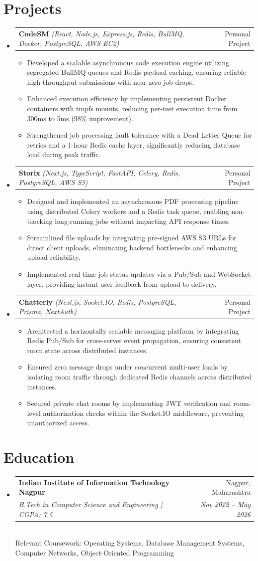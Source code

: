 \documentclass[letterpaper,10pt]{article}
\makeatletter
\newenvironment{resumeList}{
  \begin{itemize}[leftmargin=0.15in, label={}]
}{
  \end{itemize}
}
\newcommand{\resumeItem}[1]{
  \item\small{
    {#1 \vspace{-2.5pt}}
  }
}
\newcommand{\resumeSubheading}[4]{
  \vspace{-2pt}\item
    \begin{tabular*}{0.97\textwidth}[t]{l@{\extracolsep{\fill}}r}
      \textbf{#1} & #2 \\
      \textit{\small#3} & \textit{\small #4} \\
    \end{tabular*}\vspace{-6pt}
}
\newcommand{\resumeProjectHeading}[3]{
  \vspace{-2pt}\item
    \begin{tabular*}{0.97\textwidth}[t]{l@{\extracolsep{\fill}}r}
      \textbf{#1} \textit{\small(#2)} & #3 \\
    \end{tabular*}\vspace{-6pt}
}
\newcommand{\resumeItemListStart}{\begin{itemize}[leftmargin=0.15in]}
\newcommand{\resumeItemListEnd}{\end{itemize}\vspace{-5pt}}
\makeatother
\begin{document}
\section{Projects}
\begin{resumeList}
    \resumeProjectHeading
    {CodeSM}{React, Node.js, Express.js, Redis, BullMQ, Docker, PostgreSQL, AWS EC2}{Personal Project}
  \resumeItemListStart
    \resumeItem{Developed a scalable asynchronous code execution engine utilizing segregated BullMQ queues and Redis payload caching, ensuring reliable high-throughput submissions with near-zero job drops.}
    \resumeItem{Enhanced execution efficiency by implementing persistent Docker containers with tmpfs mounts, reducing per-test execution time from 300ms to 5ms (98\% improvement).}
    \resumeItem{Strengthened job processing fault tolerance with a Dead Letter Queue for retries and a 1-hour Redis cache layer, significantly reducing database load during peak traffic.}
  \resumeItemListEnd

  \resumeProjectHeading
    {Storix}{Next.js, TypeScript, FastAPI, Celery, Redis, PostgreSQL, AWS S3}{Personal Project}
  \resumeItemListStart
    \resumeItem{Designed and implemented an asynchronous PDF processing pipeline using distributed Celery workers and a Redis task queue, enabling non-blocking long-running jobs without impacting API response times.}
    \resumeItem{Streamlined file uploads by integrating pre-signed AWS S3 URLs for direct client uploads, eliminating backend bottlenecks and enhancing upload reliability.}
    \resumeItem{Implemented real-time job status updates via a Pub/Sub and WebSocket layer, providing instant user feedback from upload to delivery.}
  \resumeItemListEnd

  \resumeProjectHeading
    {Chatterly}{Next.js, Socket.IO, Redis, PostgreSQL, Prisma, NextAuth}{Personal Project}
  \resumeItemListStart
    \resumeItem{Architected a horizontally scalable messaging platform by integrating Redis Pub/Sub for cross-server event propagation, ensuring consistent room state across distributed instances.}
    \resumeItem{Ensured zero message drops under concurrent multi-user loads by isolating room traffic through dedicated Redis channels across distributed instances.}
    \resumeItem{Secured private chat rooms by implementing JWT verification and room-level authorization checks within the Socket.IO middleware, preventing unauthorized access.}
  \resumeItemListEnd
\end{resumeList}

\section{Education}
\begin{resumeList}
    \resumeSubheading
    {Indian Institute of Information Technology Nagpur}{Nagpur, Maharashtra}
    {B.Tech in Computer Science and Engineering | CGPA: 7.5}{Nov 2022 – May 2026}
    \vspace{2pt}\\
    \small{Relevant Coursework: Operating Systems, Database Management Systems, Computer Networks, Object-Oriented Programming}
\end{resumeList}
\end{document}
